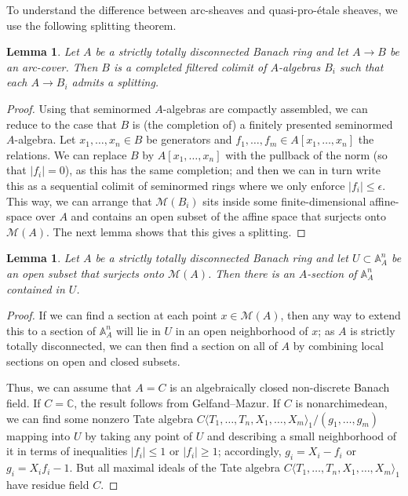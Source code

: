 \documentclass[11pt]{amsart}
\numberwithin{equation}{section}
\numberwithin{theorem}{section}
\newtheorem{lemma}[theorem]{Lemma}
\theoremstyle{definition}
\begin{document}
To understand the difference between arc-sheaves and quasi-pro-\'etale sheaves, we use the following splitting theorem.

\begin{lemma}\label{lem:coversplits} Let $A$ be a strictly totally disconnected Banach ring and let $A\to B$ be an arc-cover. Then $B$ is a completed filtered colimit of $A$-algebras $B_i$ such that each $A\to B_i$ admits a splitting.
\end{lemma}

\begin{proof} Using that seminormed $A$-algebras are compactly assembled, we can reduce to the case that $B$ is (the completion of) a finitely presented seminormed $A$-algebra. Let $x_1,\ldots,x_n\in B$ be generators and $f_1,\ldots,f_m\in A[x_1,\ldots,x_n]$ the relations. We can replace $B$ by $A[x_1,\ldots,x_n]$ with the pullback of the norm (so that $|f_i|=0$), as this has the same completion; and then we can in turn write this as a sequential colimit of seminormed rings where we only enforce $|f_i|\leq \epsilon$. This way, we can arrange that $\mathcal M(B_i)$ sits inside some finite-dimensional affine-space over $A$ and contains an open subset of the affine space that surjects onto $\mathcal M(A)$. The next lemma shows that this gives a splitting.
\end{proof}

\begin{lemma}\label{lem:smoothspacessplit} Let $A$ be a strictly totally disconnected Banach ring and let $U\subset \mathbb A^n_A$ be an open subset that surjects onto $\mathcal M(A)$. Then there is an $A$-section of $\mathbb A^n_A$ contained in $U$.
\end{lemma}

\begin{proof} If we can find a section at each point $x\in \mathcal M(A)$, then any way to extend this to a section of $\mathbb A^n_A$ will lie in $U$ in an open neighborhood of $x$; as $A$ is strictly totally disconnected, we can then find a section on all of $A$ by combining local sections on open and closed subsets.

Thus, we can assume that $A=C$ is an algebraically closed non-discrete Banach field. If $C=\mathbb C$, the result follows from Gelfand--Mazur. If $C$ is nonarchimedean, we can find some nonzero Tate algebra $C\langle T_1,\ldots,T_n,X_1,\ldots,X_m\rangle_1/(g_1,\ldots,g_m)$ mapping into $U$ by taking any point of $U$ and describing a small neighborhood of it in terms of  inequalities $|f_i|\leq 1$ or $|f_i|\geq 1$; accordingly, $g_i=X_i-f_i$ or $g_i = X_if_i - 1$. But all maximal ideals of the Tate algebra $C\langle T_1,\ldots,T_n,X_1,\ldots,X_m\rangle_1$ have residue field $C$.
\end{proof}
\end{document}
